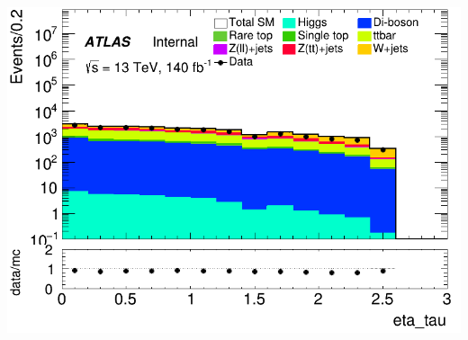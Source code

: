 \documentclass[usenames,dvipsnames]{beamer}
\begin{document}
\begin{frame}
\begin{minipage}{0.32\textwidth}
        \centering
        \includegraphics[width=\textwidth]{graphics/L_met/L_met_eta_tau.png}
    \end{minipage}
\end{frame}
\end{document}
